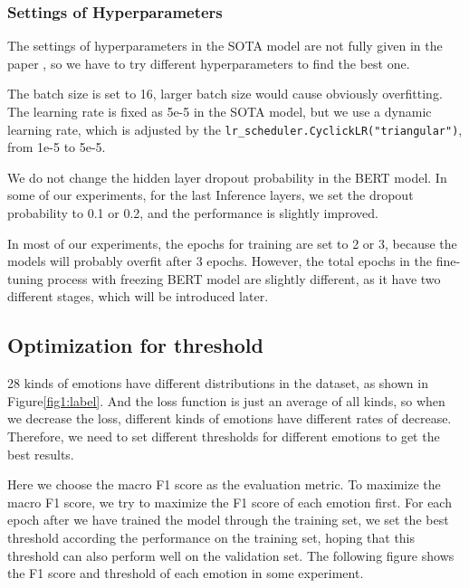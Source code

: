 \documentclass{article}
\begin{document}
\subsubsection{Settings of Hyperparameters}

The settings of hyperparameters in the SOTA model are not fully given in the paper \cite{goemotions}, so we have to try different hyperparameters to find the best one.

The batch size is set to 16, larger batch size would cause obviously overfitting. The learning rate is fixed as 5e-5 in the SOTA model, but we use a dynamic learning rate, which is adjusted by the \texttt{lr\_scheduler.CyclickLR("triangular")}, from 1e-5 to 5e-5.

We do not change the hidden layer dropout probability in the BERT model. In some of our experiments, for the last Inference layers, we set the dropout probability to 0.1 or 0.2, and the performance is slightly improved.

In most of our experiments, the epochs for training are set to 2 or 3, because the models will probably overfit after 3 epochs. However, the total epochs in the fine-tuning process with freezing BERT model are slightly different, as it have two different stages, which will be introduced later.

\subsection{Optimization for threshold}

28 kinds of emotions have different distributions in the dataset, as shown in Figure\ref{fig1:label}. And the loss function is just an average of all kinds, so when we decrease the loss, different kinds of emotions have different rates of decrease. Therefore, we need to set different thresholds for different emotions to get the best results.

Here we choose the macro F1 score as the evaluation metric. To maximize the macro F1 score, we try to maximize the F1 score of each emotion first. For each epoch after we have trained the model through the training set, we set the best threshold according the performance on the training set, hoping that this threshold can also perform well on the validation set. The following figure shows the F1 score and threshold of each emotion in some experiment.
\end{document}
